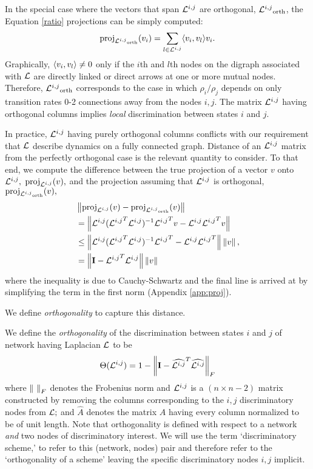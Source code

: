 In the special case where the vectors that span ${\mathcal{L}^{i,j}}$ are orthogonal, ${\mathcal{L}^{i,j}}_{\text{orth}}$, the Equation \ref{ratio} projections can be simply computed:
\begin{equation}\label{proj}
{\rm proj}_{{\mathcal{L}^{i,j}}_{\text{orth}}}(v_i) = \sum_{l\in {\mathcal{L}^{i,j}}}\langle v_i, v_l \rangle v_i.
\end{equation}
Graphically, $\langle v_i, v_l \rangle\neq 0$ only if the $i$th and $l$th nodes on the digraph associated with $\mathcal{L}$ are directly linked or direct arrows at one or more mutual nodes.  Therefore, ${\mathcal{L}^{i,j}}_{\text{orth}}$ corresponds to the case in which $\rho_i/\rho_j$ depends on only transition rates 0-2 connections away from the nodes $i,j.$  The matrix ${\mathcal{L}^{i,j}}$ having orthogonal columns implies {\it local} discrimination between states $i$ and $j$.

In practice, ${\mathcal{L}^{i,j}}$ having purely orthogonal columns conflicts with our requirement that $\mathcal{L}$ describe dynamics on a fully connected graph.  Distance of an ${\mathcal{L}^{i,j}}$ matrix from the perfectly orthogonal case is the relevant quantity to consider.
To that end, we compute the difference between the true projection of a vector $v$ onto ${\mathcal{L}^{i,j}},$ ${\rm proj}_{\mathcal{L}^{i,j}}(v),$ and the projection assuming that ${\mathcal{L}^{i,j}}$ is orthogonal, ${\rm proj}_{{\mathcal{L}^{i,j}}_{\text{orth}}}(v),$
\begin{equation}\label{orth_approx}
\begin{aligned}
&\left\lVert{\rm proj}_{\mathcal{L}^{i,j}}(v) - {\rm proj}_{{\mathcal{L}^{i,j}}_{\text{orth}}}(v)\right\rVert\\
&= \left\lVert{\mathcal{L}^{i,j}}({\mathcal{L}^{i,j}}^T{\mathcal{L}^{i,j}})^{-1}{\mathcal{L}^{i,j}}^Tv - {\mathcal{L}^{i,j}}{\mathcal{L}^{i,j}}^Tv\right\rVert \\
 &\le \left\lVert{\mathcal{L}^{i,j}}({\mathcal{L}^{i,j}}^T{\mathcal{L}^{i,j}})^{-1}{\mathcal{L}^{i,j}}^T - {\mathcal{L}^{i,j}}{\mathcal{L}^{i,j}}^T\right\rVert\left\lVert v\right\rVert,\\
& = \left\lVert\mathbf{I} - {\mathcal{L}^{i,j}}^T{\mathcal{L}^{i,j}}\right\rVert\left\lVert v\right\rVert
\end{aligned}
\end{equation}
where the inequality is due to Cauchy-Schwartz and the final line is arrived at by simplifying the term in the first norm (Appendix \ref{app:proj}).

We define {\it orthogonality} to capture this distance.

\begin{defn}[Orthogonality]{We define the {\it orthogonality} of the discrimination between states $i$ and $j$ of network having Laplacian $\mathcal{L}$ to be
\[
\Theta({\mathcal{L}^{i,j}}) = 1 - \left\lVert\mathbf{I} - \widehat{{\mathcal{L}^{i,j}}}^T\widehat{{\mathcal{L}^{i,j}}}\right\rVert_F
\]
where $\left\lVert \ \right\rVert_F$ denotes the Frobenius norm and ${\mathcal{L}^{i,j}}$ is a $(n \times n-2)$ matrix constructed by removing the columns corresponding to the $i,j$ discriminatory nodes from $\mathcal{L};$ and $\widehat{A}$ denotes the matrix $A$ having every column normalized to be of unit length.  Note that orthogonality is defined with respect to a network {\it and} two nodes of discriminatory interest.  We will use the term `discriminatory scheme,' to refer to this (network, nodes) pair and therefore refer to the `orthogonality of a scheme' leaving the specific discriminatory nodes $i,j$ implicit.
}
\end{defn}


